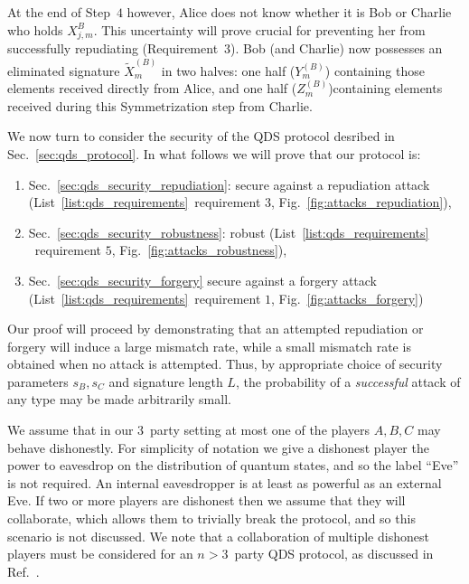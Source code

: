  At the end of Step~$4$ however, Alice does not know whether it is Bob or Charlie who holds $X_{j, m}^B$. This uncertainty will prove crucial for preventing her from successfully repudiating (Requirement~$3$). Bob (and Charlie) now possesses an eliminated signature $\tilde{X}_m^{\left(B\right)}$ in two halves: one half ($Y_m^{\left(B\right)}$) containing those elements received directly from Alice, and one half ($Z_m^{\left(B\right)}$)containing elements received during this Symmetrization step from Charlie.
 \fi


We now turn to consider the security of the QDS protocol desribed in Sec.~\ref{sec:qds_protocol}. %
In what follows we will prove that our protocol is:
\begin{enumerate}
\item Sec.~\ref{sec:qds_security_repudiation}: secure against a repudiation attack (List~\ref{list:qds_requirements}~requirement $3$, Fig.~\ref{fig:attacks_repudiation}), 
\item Sec.~\ref{sec:qds_security_robustness}: robust (List~\ref{list:qds_requirements} ~requirement $5$, Fig.~\ref{fig:attacks_robustness}),
\item Sec.~\ref{sec:qds_security_forgery} secure against a forgery attack (List~\ref{list:qds_requirements}~requirement $1$, Fig.~\ref{fig:attacks_forgery})
\end{enumerate}

Our proof will proceed by demonstrating that an attempted repudiation or forgery will induce a large mismatch rate, while a small mismatch rate is obtained when no attack is attempted. Thus, by appropriate choice of security parameters $s_B, s_C$ and signature length $L$, the probability of a \emph{successful} attack of any type may be made arbitrarily small. 

We assume that in our $3$~party setting at most one of the players $A, B, C$ may behave dishonestly. For simplicity of notation we give a dishonest player the power to eavesdrop on the distribution of quantum states, and so the label ``Eve'' is not required. An internal eavesdropper is at least as powerful as an external Eve. If two or more players are dishonest then we assume that they will collaborate, which allows them to trivially break the protocol, and so this scenario is not discussed. We note that a collaboration of multiple dishonest players must be considered for an $n>3$~party QDS protocol, as discussed in Ref.~\cite{Arrazola2016}.

